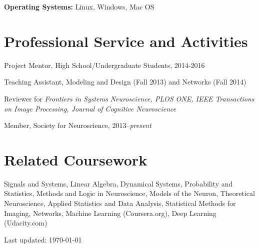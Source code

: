 \documentclass[10pt,letterpaper]{article}
\def\footerlink{} %
\renewenvironment{itemize}{
  \begin{list}{}{
    \setlength{\leftmargin}{1.5em}
    \setlength{\itemsep}{0.25em}
    \setlength{\parskip}{0pt}
    \setlength{\parsep}{0.25em}
  }
}{
  \end{list}
}
\begin{document}
\hspace{1.5em}\textbf{Operating Systems:} Linux, Windows, Mac OS

\vspace{-0.1in}

\section*{Professional Service and Activities}
\vspace{-0.05in}
\begin{itemize}
\setlength\itemsep{1pt}
\item Project Mentor, High School/Undergraduate Students, 2014-2016
\item Teaching Assistant, Modeling and Design (Fall 2013) and Networks (Fall 2014)
\item Reviewer for \textit{Frontiers in Systems Neuroscience, PLOS ONE, IEEE Transactions on Image Processing, Journal of Cognitive Neuroscience}

\item Member, Society for Neuroscience, 2013--\textit{present}
\end{itemize}

\vspace{-0.25in}

\section*{Related Coursework}
\vspace{-0.05in}
\begin{itemize}
\item Signals and Systems,
Linear Algebra,
Dynamical Systems,
Probability and Statistics,
Methods and Logic in Neuroscience,
Models of the Neuron,
Theoretical Neuroscience,
Applied Statistics and Data Analysis,
Statistical Methods for Imaging,
Networks, Machine Learning (Coursera.org), Deep Learning (Udacity.com)
\end{itemize}

\bigskip

\begin{center}
  \begin{footnotesize}
    Last updated: \today \\
    \href{\footerlink}{\texttt{\footerlink}}
  \end{footnotesize}
\end{center}

%
\end{document}
